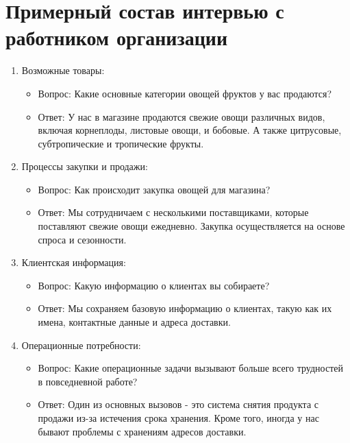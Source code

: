\documentclass[14pt]{extreport}
\begin{document}
    \section{Примерный состав интервью с работником организации}

        \begin{enumerate}
            \item Возможные товары:
            
            \begin{itemize}
                \item Вопрос: Какие основные категории овощей фруктов у вас продаются?
                \item Ответ: У нас в магазине продаются свежие овощи различных видов, включая корнеплоды, листовые овощи, и бобовые. А также цитрусовые, субтропические и тропические фрукты.
            \end{itemize}
            
            \item Процессы закупки и продажи:
            
            \begin{itemize}
                \item Вопрос: Как происходит закупка овощей для магазина?
                \item Ответ: Мы сотрудничаем с несколькими поставщиками, которые поставляют свежие овощи ежедневно. Закупка осуществляется на основе спроса и сезонности.
            \end{itemize}

            \item Клиентская информация:
            
            \begin{itemize}
                \item Вопрос: Какую информацию о клиентах вы собираете?
                \item Ответ: Мы сохраняем базовую информацию о клиентах, такую как их имена, контактные данные и адреса доставки.
            \end{itemize}

            \item{Операционные потребности:}
            \begin{itemize}
                \item Вопрос: Какие операционные задачи вызывают больше всего трудностей в повседневной работе?
                \item Ответ: Один из основных вызовов - это система снятия продукта с продажи из-за истечения срока хранения. Кроме того, иногда у нас бывают проблемы с хранениям адресов доставки.
            \end{itemize}


\end{enumerate}
\end{document}
